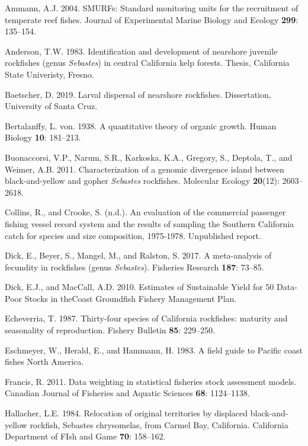 \documentclass[12pt,]{article}
\begin{document}
\hypertarget{ref-Ammann2004}{}
Ammann, A.J. 2004. SMURFs: Standard monitoring units for the recruitment
of temperate reef fishes. Journal of Experimental Marine Biology and
Ecology \textbf{299}: 135--154.

\hypertarget{ref-Anderson1983}{}
Anderson, T.W. 1983. Identification and development of nearshore
juvenile rockfishes (genus \emph{Sebastes}) in central California kelp
forests. Thesis, California State Univeristy, Fresno.

\hypertarget{ref-Baetscher2019}{}
Baetscher, D. 2019. Larval dispersal of nearshore rockfishes.
Dissertation, University of Santa Cruz.

\hypertarget{ref-vonB1938}{}
Bertalanffy, L. von. 1938. A quantitative theory of organic growth.
Human Biology \textbf{10}: 181--213.

\hypertarget{ref-Buonaccorsi2011}{}
Buonaccorsi, V.P., Narum, S.R., Karkoska, K.A., Gregory, S., Deptola,
T., and Weimer, A.B. 2011. Characterization of a genomic divergence
island between black-and-yellow and gopher \emph{Sebastes} rockfishes.
Molecular Ecology \textbf{20}(12): 2603--2618.

\hypertarget{ref-Collins1978}{}
Collins, R., and Crooke, S. (n.d.). An evaluation of the commercial
passenger fishing vessel record system and the results of sampling the
Southern California catch for species and size composition, 1975-1978.
Unpublished report.

\hypertarget{ref-Dick2017}{}
Dick, E., Beyer, S., Mangel, M., and Ralston, S. 2017. A meta-analysis
of fecundity in rockfishes (genus \emph{Sebastes}). Fisheries Research
\textbf{187}: 73--85.

\hypertarget{ref-Dick2010}{}
Dick, E.J., and MacCall, A.D. 2010. Estimates of Sustainable Yield for
50 Data-Poor Stocks in theCoast Groundfish Fishery Management Plan.

\hypertarget{ref-Echeverria1987}{}
Echeverria, T. 1987. Thirty-four species of California rockfishes:
maturity and seasonality of reproduction. Fishery Bulletin \textbf{85}:
229--250.

\hypertarget{ref-Eschmeyer1983}{}
Eschmeyer, W., Herald, E., and Hammann, H. 1983. A field guide to
Pacific coast fishes North America.

\hypertarget{ref-Francis2011}{}
Francis, R. 2011. Data weighting in statistical fisheries stock
assessment models. Canadian Journal of Fisheries and Aquatic Sciences
\textbf{68}: 1124--1138.

\hypertarget{ref-Hallacher1984}{}
Hallacher, L.E. 1984. Relocation of original territories by displaced
black-and-yellow rockfish, Sebastes chrysomelas, from Carmel Bay,
California. California Department of FIsh and Game \textbf{70}:
158--162.
\end{document}
